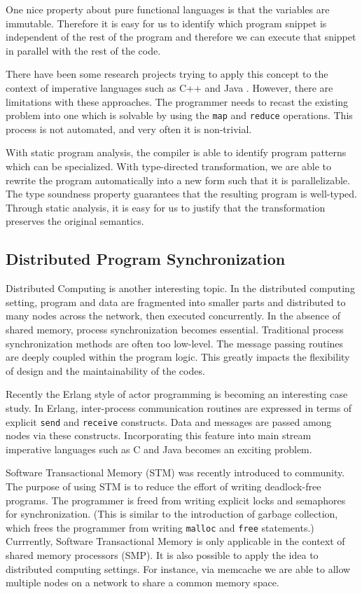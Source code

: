 \documentclass[12pt]{article}
\theoremstyle{plain} \numberwithin{equation}{section}
\theoremstyle{definition}
\begin{document}
{One nice property about pure functional languages is that
the variables are immutable. Therefore it is easy for us to identify
which program snippet is independent of the rest of the program
and therefore we can execute that snippet in parallel with the rest of
the code. 

There have been some research projects trying to apply this concept
to the context of imperative languages such as C++ \cite{mapreduce} 
and Java \cite{hadoop}. However, there are limitations with these
approaches. The programmer needs to recast the existing problem into 
one which is solvable by using the {\tt map} and {\tt reduce} operations.
This process is not automated, and very often it is non-trivial.

With static program analysis, the compiler
is able to identify program patterns which can be specialized.
With type-directed transformation, we are able to rewrite the program 
automatically into a new form such that it is parallelizable. The 
type soundness property guarantees that the resulting program is
well-typed. Through static analysis, it is easy for us to justify that the
transformation preserves the original semantics.


\subsection{Distributed Program Synchronization}
Distributed Computing is another interesting topic. In the distributed
computing setting, program and data are fragmented into smaller parts and 
distributed to many nodes across the network, then executed concurrently. 
In the absence of shared
memory, process synchronization becomes essential. Traditional process
synchronization methods are often too low-level. The message passing routines
are deeply coupled within the program logic. This greatly impacts 
the flexibility of design and the maintainability of the codes.

Recently the Erlang \cite{erlang} style of actor programming is becoming
an interesting case study. In Erlang, inter-process communication
routines are expressed in terms of explicit {\tt send} and {\tt receive}
constructs. Data and messages are passed among nodes via these
constructs. Incorporating this feature into main stream imperative
languages such as C and Java becomes an exciting problem. 

Software Transactional Memory (STM) \cite{stm} was recently introduced to
community. The purpose of using STM is to reduce the effort of 
writing deadlock-free programs. The programmer is freed from 
writing explicit locks and semaphores for synchronization. (This is
similar to the introduction of garbage collection, which 
frees the programmer from writing {\tt malloc} and {\tt free} statements.) Currrently, Software Transactional Memory is only applicable in the context of 
shared memory processors (SMP). It is also possible to apply the
idea to distributed computing settings. For instance, via memcache
we are able to allow multiple nodes on a network to share a common
memory space.  

}
\end{document}
